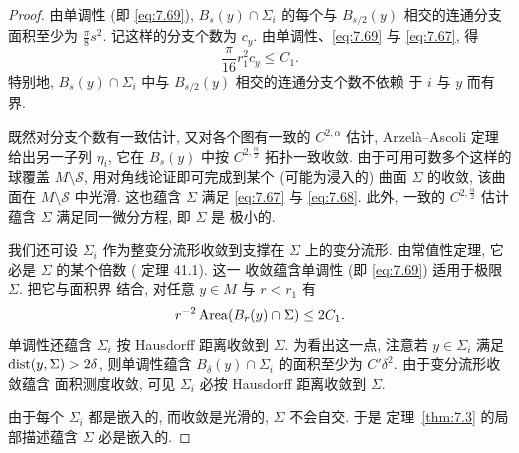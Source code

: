 \begin{proof}
由单调性 (即 \eqref{eq:7.69}), $B_s(y)\cap\Sigma_i$ 的每个与
$B_{s/2}(y)$ 相交的连通分支面积至少为 $\frac\pi8s^2$. 记这样的分支个数为
$c_y$. 由单调性、\eqref{eq:7.69} 与 \eqref{eq:7.67}, 得
\begin{equation}
\frac\pi{16}r_1^2c_y\leq C_1.
\label{eq:7.75}
\end{equation}
特别地, $B_s(y)\cap\Sigma_i$ 中与 $B_{s/2}(y)$ 相交的连通分支个数不依赖
于 $i$ 与 $y$ 而有界.

既然对分支个数有一致估计, 又对各个图有一致的 $C^{2,\alpha}$ 估计,
Arzelà--Ascoli 定理给出另一子列 $\eta_i$, 它在 $B_s(y)$ 中按
$C^{2,\frac\alpha2}$ 拓扑一致收敛. 由于可用可数多个这样的球覆盖
$M\setminus\mathcal{S}$, 用对角线论证即可完成到某个 (可能为浸入的) 曲面
$\Sigma$ 的收敛, 该曲面在 $M\setminus\mathcal{S}$ 中光滑. 这也蕴含
$\Sigma$ 满足 \eqref{eq:7.67} 与 \eqref{eq:7.68}. 此外, 一致的
$C^{2,\frac\alpha2}$ 估计蕴含 $\Sigma$ 满足同一微分方程, 即 $\Sigma$ 是
极小的.

我们还可设 $\Sigma_i$ 作为整变分流形收敛到支撑在 $\Sigma$ 上的变分流形.
由常值性定理, 它必是 $\Sigma$ 的某个倍数 (\cite{Si4} 定理 41.1). 这一
收敛蕴含单调性 (即 \eqref{eq:7.69}) 适用于极限 $\Sigma$. 把它与面积界
结合, 对任意 $y\in M$ 与 $r<r_1$ 有
\begin{equation}
r^{-2}\operatorname{Area}(B_r(y)\cap\Sigma)\leq2C_1.
\label{eq:7.76}
\end{equation}
单调性还蕴含 $\Sigma_i$ 按 Hausdorff 距离收敛到 $\Sigma$. 为看出这一点,
注意若 $y\in\Sigma_i$ 满足 $\operatorname{dist}(y,\Sigma)>2\delta$, 则单调性蕴含
$B_\delta(y)\cap\Sigma_i$ 的面积至少为 $C'\delta^2$. 由于变分流形收敛蕴含
面积测度收敛, 可见 $\Sigma_i$ 必按 Hausdorff 距离收敛到 $\Sigma$.

由于每个 $\Sigma_i$ 都是嵌入的, 而收敛是光滑的, $\Sigma$ 不会自交. 于是
定理~\ref{thm:7.3} 的局部描述蕴含 $\Sigma$ 必是嵌入的.


\end{proof}
